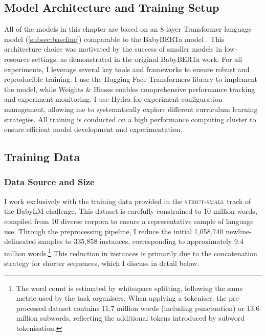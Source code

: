 \subsection{Model Architecture and Training Setup}
All of the models in this chapter are based on an 8-layer Transformer language model (\cref{subsec:baseline}) comparable to the BabyBERTa model \citep{huebner2021babyberta}. This architecture choice was motivated by the success of smaller models in low-resource settings, as demonstrated in the original BabyBERTa work. For all experiments, I leverage several key tools and frameworks to ensure robust and reproducible training. I use the Hugging Face Transformers library \citep{transformers} to implement the model, while Weights \& Biases \citep{wandb} enables comprehensive performance tracking and experiment monitoring. I use Hydra \citep{hydra} for experiment configuration management, allowing me to systematically explore different curriculum learning strategies. All training is conducted on a high performance computing cluster to ensure efficient model development and experimentation.

\subsection{Training Data}
\label{subsec:data}

\subsubsection{Data Source and Size}
I work exclusively with the training data provided in the \textsc{strict-small} track of the BabyLM challenge. This dataset is carefully constrained to 10 million words, compiled from 10 diverse corpora to ensure a representative sample of language use. Through the preprocessing pipeline, I reduce the initial 1,058,740 newline-delineated samples to 335,858 instances, corresponding to approximately 9.4 million words.\footnote{The word count is estimated by whitespace splitting, following the same metric used by the task organisers. When applying a tokeniser, the pre-processed dataset contains 11.7 million words (including punctuation) or 13.6 million subwords, reflecting the additional tokens introduced by subword tokenisation.} This reduction in instances is primarily due to the concatenation strategy for shorter sequences, which I discuss in detail below.

